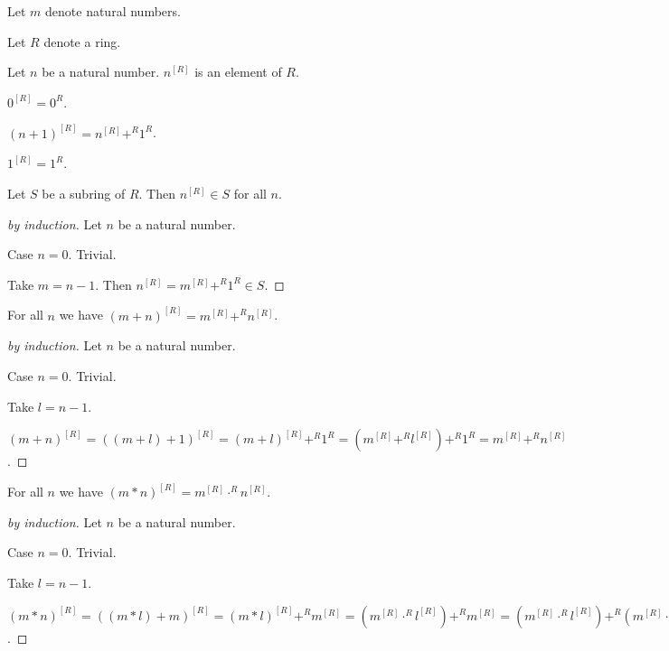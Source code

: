 \documentclass[11pt]{article}
\begin{document}
\begin{forthel}

Let $m$ denote natural numbers.

Let $R$ denote a ring.

\begin{signature} Let $n$ be a natural number. $n^{[R]}$ is an element of $R$.
\end{signature}

\begin{axiom} $0^{[R]} = 0^{R}$.
\end{axiom}

\begin{axiom} $(n+1)^{[R]} = n^{[R]} +^{R} 1^{R}$.
\end{axiom}

\begin{lemma}
$1^{[R]} = 1^{R}$.
\end{lemma}

\begin{lemma}
Let $S$ be a subring of $R$. Then $n^{[R]} \in S$ for all $n$.
\end{lemma}
\begin{proof}[by induction]
Let $n$ be a natural number.

Case $n = 0$. Trivial.

Take $m = n - 1$. Then $n^{[R]} = m^{[R]} +^{R} 1^{R} \in S$.
\end{proof}

\begin{lemma}
For all $n$ we have
$(m + n)^{[R]} = m^{[R]} +^{R} n^{[R]}$.
\end{lemma}
\begin{proof}[by induction]
Let $n$ be a natural number.

Case $n = 0$. Trivial.

Take $l = n - 1$.

$(m + n)^{[R]} = 
((m + l) + 1)^{[R]} =
(m + l)^{[R]} +^{R} 1^{R} =
(m^{[R]} +^{R} l^{[R]}) +^{R} 1^{R} =
m^{[R]} +^{R} n^{[R]}$.
\end{proof}

\begin{lemma}
For all $n$ we have
$(m * n)^{[R]} = m^{[R]} \cdot^{R} n^{[R]}$.
\end{lemma}
\begin{proof}[by induction]
Let $n$ be a natural number.

Case $n = 0$. Trivial.

Take $l = n - 1$.

$(m * n)^{[R]} = 
((m * l) + m)^{[R]} =
(m * l)^{[R]} +^{R} m^{[R]} =
(m^{[R]} \cdot^{R} l^{[R]}) +^{R} m^{[R]} =
(m^{[R]} \cdot^{R} l^{[R]}) +^{R} (m^{[R]} \cdot^{R} 1^{R}) =
m^{[R]} \cdot^{R} (l + 1)^{[R]}$.
\end{proof}


\end{forthel}
\end{document}
